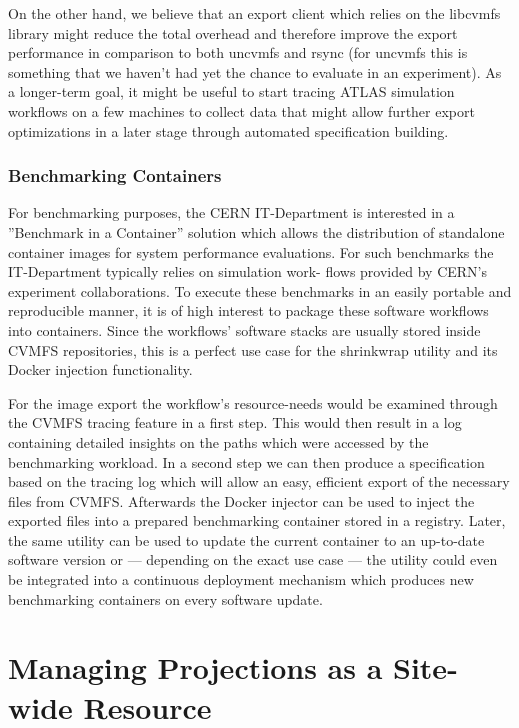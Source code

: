 \documentclass[sigconf]{acmart}
\begin{document}
On the other hand, we believe that an export client which relies on the libcvmfs library might reduce the total overhead and therefore improve the export performance in comparison to both uncvmfs and rsync (for uncvmfs this is something that we haven’t had yet the chance to evaluate in an experiment).
As a longer-term goal, it might be useful to start tracing ATLAS simulation workflows on a few machines to collect data that might allow further export optimizations in a later stage through automated specification building.

\subsubsection{Benchmarking Containers}
For benchmarking purposes, the CERN IT-Department is interested in a ”Benchmark in a Container” solution which allows the distribution of standalone container images for system performance evaluations. For such benchmarks the IT-Department typically relies on simulation work- flows provided by CERN’s experiment collaborations. To execute these benchmarks in an easily portable and reproducible manner, it is of high interest to package these software workflows into containers. Since the workflows’ software stacks are usually stored inside CVMFS repositories, this is a perfect use case for the shrinkwrap utility and its Docker injection functionality.

For the image export the workflow’s resource-needs would be examined through the CVMFS tracing feature in a first step. This would then result in a log containing detailed insights on the paths which were accessed by the benchmarking workload. In a second step we can then produce a specification based on the tracing log which will allow an easy, efficient export of the necessary files from CVMFS. Afterwards the Docker injector can be used to inject the exported files into a prepared benchmarking container stored in a registry. Later, the same utility can be used to update the current container to an up-to-date software version or — depending on the exact use case — the utility could even be integrated into a continuous deployment mechanism which produces new benchmarking containers on every software update.

\section{Managing Projections as a Site-wide Resource}
\end{document}
